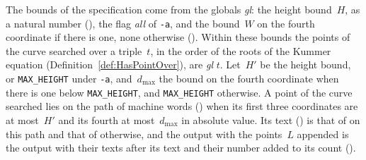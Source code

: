 The bounds of the specification come from the globals \textit{gl}: the height bound~$H$, as a
natural number (), the flag \textit{all} of \texttt{-a}, and the
bound~$W$ on the fourth coordinate if there is one, none otherwise ().
Within these bounds the points of the curve searched over a triple~$t$, in the order of the roots
of the Kummer equation (Definition~\ref{def:HasPointOver}), are 
\textit{gl} $t$. Let~$H'$ be the height bound, or \texttt{MAX\_HEIGHT} under \texttt{-a},
and~$d_{\max}$ the bound on the fourth coordinate when there is one below \texttt{MAX\_HEIGHT},
and \texttt{MAX\_HEIGHT} otherwise. A point of the curve searched lies on the path of machine words
() when its first three coordinates are at most~$H'$ and its
fourth at most~$d_{\max}$ in absolute value. Its text () is that
of  on this path and that of 
otherwise, and the output with the points~$L$ appended is the output with their texts after its
text and their number added to its count ().

